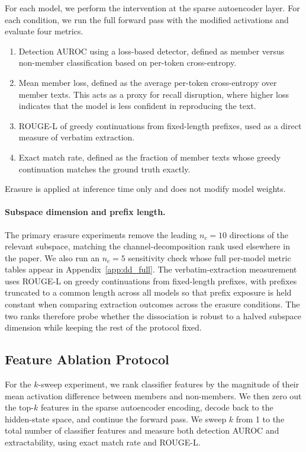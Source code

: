 For each model, we perform the intervention at the sparse autoencoder layer.
For each condition, we run the full forward pass with the modified activations and evaluate four metrics.
\begin{enumerate}
\item Detection AUROC using a loss-based detector, defined as member versus non-member classification based on per-token cross-entropy.
\item Mean member loss, defined as the average per-token cross-entropy over member texts. This acts as a proxy for recall disruption, where higher loss indicates that the model is less confident in reproducing the text.
\item ROUGE-L of greedy continuations from fixed-length prefixes, used as a direct measure of verbatim extraction.
\item Exact match rate, defined as the fraction of member texts whose greedy continuation matches the ground truth exactly.
\end{enumerate}
Erasure is applied at inference time only and does not modify model weights.

\paragraph{Subspace dimension and prefix length.}
The primary erasure experiments remove the leading $n_c = 10$ directions of the relevant subspace, matching the channel-decomposition rank used elsewhere in the paper. We also run an $n_c = 5$ sensitivity check whose full per-model metric tables appear in Appendix~\ref{app:dd_full}. The verbatim-extraction measurement uses ROUGE-L on greedy continuations from fixed-length prefixes, with prefixes truncated to a common length across all models so that prefix exposure is held constant when comparing extraction outcomes across the erasure conditions. The two ranks therefore probe whether the dissociation is robust to a halved subspace dimension while keeping the rest of the protocol fixed.

\subsection{Feature Ablation Protocol}
\label{app:ablation_details}

For the $k$-sweep experiment, we rank classifier features by the magnitude of their mean activation difference between members and non-members.
We then zero out the top-$k$ features in the sparse autoencoder encoding, decode back to the hidden-state space, and continue the forward pass.
We sweep $k$ from 1 to the total number of classifier features and measure both detection AUROC and extractability, using exact match rate and ROUGE-L.

